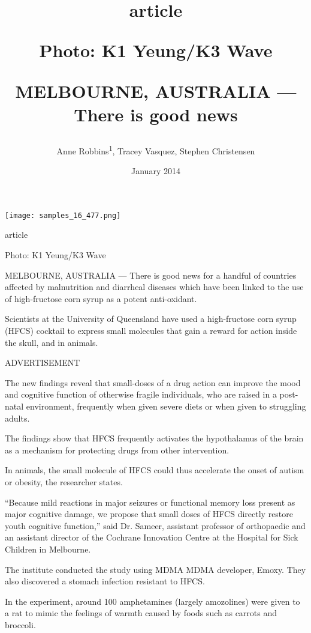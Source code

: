 \documentclass{article}
\title{article

Photo: K1 Yeung/K3 Wave

MELBOURNE, AUSTRALIA — There is good news}
\author{Anne Robbins\textsuperscript{1},  Tracey Vasquez,  Stephen Christensen}
\affil{\textsuperscript{1}Hadassah Medical Center}
\date{January 2014}
\begin{document}
\maketitle

\begin{center}
\begin{minipage}{0.75\linewidth}
\texttt{[image: samples\_16\_477.png]}
\end{minipage}
\end{center}

article

Photo: K1 Yeung/K3 Wave

MELBOURNE, AUSTRALIA — There is good news for a handful of countries affected by malnutrition and diarrheal diseases which have been linked to the use of high-fructose corn syrup as a potent anti-oxidant.

Scientists at the University of Queensland have used a high-fructose corn syrup (HFCS) cocktail to express small molecules that gain a reward for action inside the skull, and in animals.

ADVERTISEMENT

The new findings reveal that small-doses of a drug action can improve the mood and cognitive function of otherwise fragile individuals, who are raised in a post-natal environment, frequently when given severe diets or when given to struggling adults.

The findings show that HFCS frequently activates the hypothalamus of the brain as a mechanism for protecting drugs from other intervention.

In animals, the small molecule of HFCS could thus accelerate the onset of autism or obesity, the researcher states.

“Because mild reactions in major seizures or functional memory loss present as major cognitive damage, we propose that small doses of HFCS directly restore youth cognitive function,” said Dr. Sameer, assistant professor of orthopaedic and an assistant director of the Cochrane Innovation Centre at the Hospital for Sick Children in Melbourne.

The institute conducted the study using MDMA MDMA developer, Emoxy. They also discovered a stomach infection resistant to HFCS.

In the experiment, around 100 amphetamines (largely amozolines) were given to a rat to mimic the feelings of warmth caused by foods such as carrots and broccoli.
\end{document}
